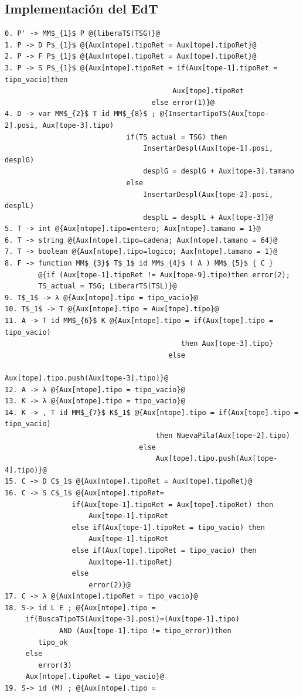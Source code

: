 \documentclass[a4paper, 12pt]{article}
\begin{document}
\subsection{Implementación del EdT}
\begin{lstlisting}[style=EdT]
0. P' -> MM$_{1}$ P @{liberaTS(TSG)}@
1. P -> D P$_{1}$ @{Aux[ntope].tipoRet = Aux[tope].tipoRet}@
2. P -> F P$_{1}$ @{Aux[ntope].tipoRet = Aux[tope].tipoRet}@
3. P -> S P$_{1}$ @{Aux[ntope].tipoRet = if(Aux[tope-1].tipoRet = tipo_vacio)then 
										Aux[tope].tipoRet
								   else error(1)}@
4. D -> var MM$_{2}$ T id MM$_{8}$ ; @{InsertarTipoTS(Aux[tope-2].posi, Aux[tope-3].tipo)
       						 if(TS_actual = TSG) then
           						 InsertarDespl(Aux[tope-1].posi, desplG)
           						 desplG = desplG + Aux[tope-3].tamano
       						 else
           						 InsertarDespl(Aux[tope-2].posi, desplL)
            					 desplL = desplL + Aux[tope-3]}@ 
5. T -> int @{Aux[ntope].tipo=entero; Aux[ntope].tamano = 1}@
6. T -> string @{Aux[ntope].tipo=cadena; Aux[ntope].tamano = 64}@
7. T -> boolean @{Aux[ntope].tipo=logico; Aux[ntope].tamano = 1}@
8. F -> function MM$_{3}$ T$_1$ id MM$_{4}$ ( A ) MM$_{5}$ { C } 
		@{if (Aux[tope-1].tipoRet != Aux[tope-9].tipo)then error(2);
		TS_actual = TSG; LiberarTS(TSL)}@
9. T$_1$ -> λ @{Aux[ntope].tipo = tipo_vacio}@
10. T$_1$ -> T @{Aux[ntope].tipo = Aux[tope].tipo}@
11. A -> T id MM$_{6}$ K @{Aux[ntope].tipo = if(Aux[tope].tipo = tipo_vacio)
										  then Aux[tope-3].tipo}
									   else
										  Aux[tope].tipo.push(Aux[tope-3].tipo)}@
12. A -> λ @{Aux[ntope].tipo = tipo_vacio}@
13. K -> λ @{Aux[ntope].tipo = tipo_vacio}@
14. K -> , T id MM$_{7}$ K$_1$ @{Aux[ntope].tipo = if(Aux[tope].tipo = tipo_vacio)
                    				then NuevaPila(Aux[tope-2].tipo)
             					else
                    				Aux[tope].tipo.push(Aux[tope-4].tipo)}@
15. C -> D C$_1$ @{Aux[ntope].tipoRet = Aux[tope].tipoRet}@           
16. C -> S C$_1$ @{Aux[ntope].tipoRet=
        		if(Aux[tope-1].tipoRet = Aux[tope].tipoRet) then
            		Aux[tope-1].tipoRet
        		else if(Aux[tope-1].tipoRet = tipo_vacio) then
            		Aux[tope-1].tipoRet
        		else if(Aux[tope].tipoRet = tipo_vacio) then
            		Aux[tope-1].tipoRet}
        		else
            		error(2)}@   
17. C -> λ @{Aux[ntope].tipoRet = tipo_vacio}@
18. S-> id L E ; @{Aux[ntope].tipo =
     if(BuscaTipoTS(Aux[tope-3].posi)=(Aux[tope-1].tipo)
    		 AND (Aux[tope-1].tipo != tipo_error))then
        tipo_ok
     else
        error(3)
     Aux[ntope].tipoRet = tipo_vacio}@
19. S-> id (M) ; @{Aux[ntope].tipo =

\end{lstlisting}
\end{document}
